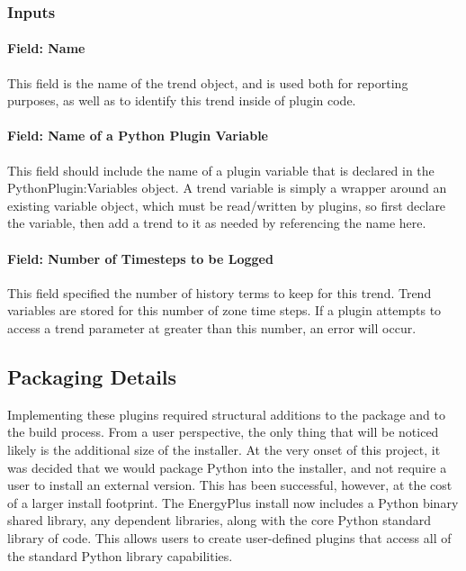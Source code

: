\subsubsection{Inputs}

\paragraph{Field: Name}

This field is the name of the trend object, and is used both for reporting purposes, as well as to identify this trend inside of plugin code.

\paragraph{Field: Name of a Python Plugin Variable}

This field should include the name of a plugin variable that is declared in the PythonPlugin:Variables object.
A trend variable is simply a wrapper around an existing variable object, which must be read/written by plugins, so first declare the variable, then add a trend to it as needed by referencing the name here.

\paragraph{Field: Number of Timesteps to be Logged}

This field specified the number of history terms to keep for this trend.
Trend variables are stored for this number of zone time steps.
If a plugin attempts to access a trend parameter at greater than this number, an error will occur.

\subsection{Packaging Details}

Implementing these plugins required structural additions to the package and to the build process.
From a user perspective, the only thing that will be noticed likely is the additional size of the installer.
At the very onset of this project, it was decided that we would package Python into the installer, and not require a user to install an external version.
This has been successful, however, at the cost of a larger install footprint.
The EnergyPlus install now includes a Python binary shared library, any dependent libraries, along with the core Python standard library of code.
This allows users to create user-defined plugins that access all of the standard Python library capabilities.

